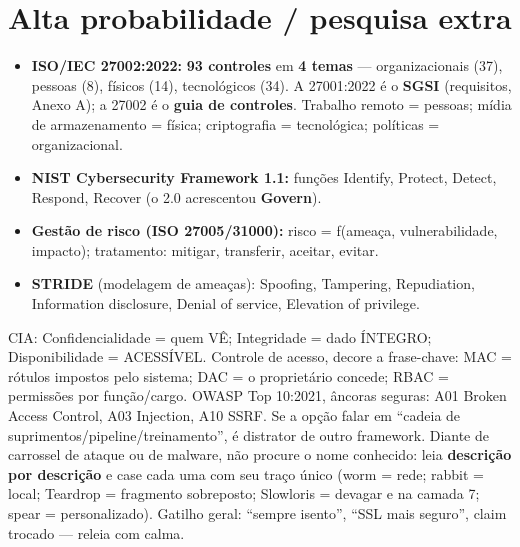 \section{Alta probabilidade / pesquisa extra}

\begin{itemize}
\item \textbf{ISO/IEC 27002:2022:} \textbf{93 controles} em \textbf{4
temas} --- organizacionais (37), pessoas (8), físicos (14), tecnológicos
(34). A 27001:2022 é o \textbf{SGSI} (requisitos, Anexo A); a 27002 é o
\textbf{guia de controles}. Trabalho remoto = pessoas; mídia de
armazenamento = física; criptografia = tecnológica; políticas =
organizacional.
\item \textbf{NIST Cybersecurity Framework 1.1:} funções Identify, Protect,
Detect, Respond, Recover (o 2.0 acrescentou \textbf{Govern}).
\item \textbf{Gestão de risco (ISO 27005/31000):} risco = f(ameaça,
vulnerabilidade, impacto); tratamento: mitigar, transferir, aceitar, evitar.
\item \textbf{STRIDE} (modelagem de ameaças): Spoofing, Tampering,
Repudiation, Information disclosure, Denial of service, Elevation of
privilege.
\end{itemize}

\begin{comosair}
CIA: Confidencialidade = quem VÊ; Integridade = dado ÍNTEGRO; Disponibilidade
= ACESSÍVEL. Controle de acesso, decore a frase-chave: MAC = rótulos impostos
pelo sistema; DAC = o proprietário concede; RBAC = permissões por
função/cargo. OWASP Top 10:2021, âncoras seguras: A01 Broken Access Control,
A03 Injection, A10 SSRF. Se a opção falar em ``cadeia de
suprimentos/pipeline/treinamento'', é distrator de outro framework. Diante de
carrossel de ataque ou de malware, não procure o nome conhecido: leia
\textbf{descrição por descrição} e case cada uma com seu traço único (worm =
rede; rabbit = local; Teardrop = fragmento sobreposto; Slowloris = devagar e
na camada 7; spear = personalizado). Gatilho geral: ``sempre isento'', ``SSL
mais seguro'', claim trocado --- releia com calma.
\end{comosair}
